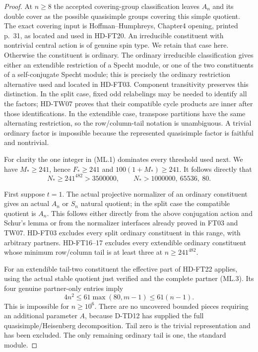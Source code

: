 \begin{proof}
At $n\ge8$ the accepted covering-group classification leaves
$A_n$ and its double cover as the possible quasisimple groups
covering this simple quotient. The exact covering input is
Hoffman--Humphreys, Chapter4 opening, printed p.~31, as located
and used in HD-FT20.\cite{BI:HHM} An irreducible constituent with
nontrivial central action is of genuine spin type. We retain that
case here. Otherwise the constituent is ordinary. The ordinary
irreducible classification gives either an extendible restriction
of a Specht module, or one of the two constituents of a
self-conjugate Specht module; this is precisely the ordinary
restriction alternative used and located in HD-FT03. Component transitivity preserves
this distinction. In the split case, fixed odd relabelings may
be needed to identify all the factors; HD-TW07 proves that their
compatible cycle products are inner after those identifications.
In the extendible case, transpose partitions have the same
alternating restriction, so the row/column-tail notation is
unambiguous. A trivial ordinary factor is impossible because
the represented quasisimple factor is faithful and nontrivial.

For clarity the one integer in (ML.1) dominates every threshold
used next. We have $M_*\ge241$, hence $F_*\ge241$ and
$100(1+M_*)\ge241$. It follows directly that
\[
          N_*\ge241^{482}>3500000,
          \qquad N_*>1000000,\ 65536,\ 80.
 \tag{ML.4}
\]

First suppose $t=1$. The actual projective normalizer of an
ordinary constituent gives an actual $A_n$ or $S_n$ natural
quotient; in the split case the compatible quotient is $A_n$.
This follows either directly from the above conjugation action
and Schur's lemma or from the normalizer interfaces already
proved in FT03 and TW07. HD-FT03 excludes every split ordinary
constituent in this range, with arbitrary partners. HD-FT16--17
excludes every extendible ordinary constituent whose minimum
row/column tail is at least three at $n\ge241^{482}$.

For an extendible tail-two constituent the effective part of
HD-FT22 applies, using the actual stable quotient just verified
and the complete partner (ML.3). Its four genuine partner-only
entries imply
\[
                  4n^2\le61\max(80,m-1)\le61(n-1).
 \tag{ML.5}
\]
This is impossible for $n\ge10^6$. There are no uncovered
bounded pieces requiring an additional parameter $A$, because
D-TD12 has supplied the full quasisimple/Heisenberg decomposition.
Tail zero is the trivial representation and has been excluded.
The only remaining ordinary tail is one, the standard module.


\end{proof}
